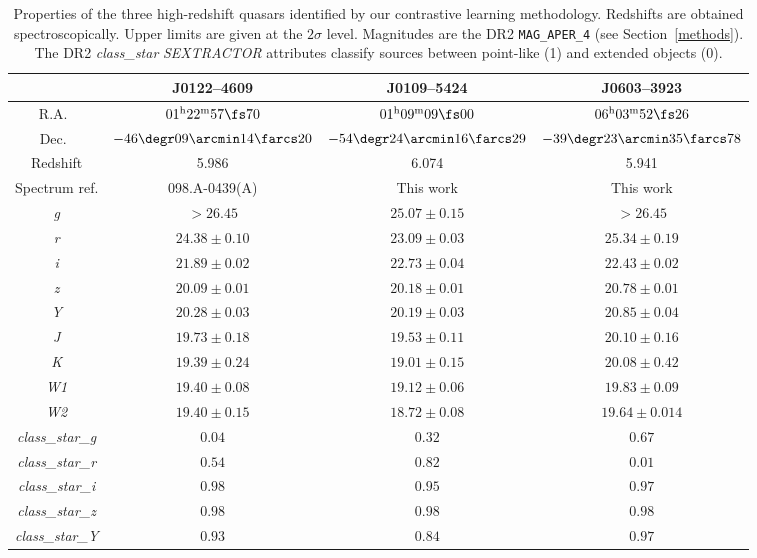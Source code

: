 \documentclass[fleqn,usenatbib]{mnras}
\begin{document}
\begin{table}
\centering
\caption{
Properties of the three high-redshift quasars identified by our contrastive learning methodology.
Redshifts are obtained spectroscopically.
Upper limits are given at the $2\sigma$ level.
Magnitudes are the DR2 \texttt{MAG\_APER\_4} (see Section~\ref{methods}). The DR2 \textit{class\_star} \textit{SEXTRACTOR} \citep{BertinArnouts96} attributes classify sources between point-like (1) and extended objects (0).
}
\label{tab:threequasars}
\begin{tabular}{cccc}
\hline
& J0122--4609 & J0109--5424 & J0603--3923\\
\hline
R.A.\
& $01^\text{h}22^\text{m}57\fs70$
& $01^\text{h}09^\text{m}09\fs00$
& $06^\text{h}03^\text{m}52\fs26$\\
Dec.\
& $-46\degr09\arcmin14\farcs20$
& $-54\degr24\arcmin16\farcs29$
& $-39\degr23\arcmin35\farcs78$\\
Redshift
& 5.986 & 6.074 & 5.941\\
Spectrum ref.
& 098.A-0439(A) & This work & This work \\
\textit{g}
&$>26.45$ & $25.07\pm0.15$ & $>26.45$ \\
\textit{r}
& $24.38\pm0.10$ & $23.09\pm0.03$ & $25.34\pm0.19$ \\
\textit{i}
& $21.89\pm0.02$ & $22.73\pm0.04$ & $22.43\pm0.02$ \\
\textit{z}
& $20.09\pm0.01$ & $20.18\pm0.01$ & $20.78\pm0.01$ \\
\textit{Y}
& $20.28\pm0.03$ & $20.19\pm0.03$ & $20.85\pm0.04$ \\
\textit{J}
& $19.73\pm0.18$ & $19.53\pm0.11$ & $20.10\pm0.16$ \\
\textit{K}
& $19.39\pm0.24$ & $19.01\pm0.15$ & $20.08\pm0.42$ \\
\textit{W1}
& $19.40\pm0.08$ & $19.12\pm0.06$ & $19.83\pm0.09$ \\
\textit{W2}
& $19.40\pm0.15$ & $18.72\pm0.08$ & $19.64\pm0.014$ \\
\textit{class\_star\_g} & $0.04$ & $0.32$ & $0.67$ \\
\textit{class\_star\_r} & $0.54$ & $0.82$ & $0.01$ \\
\textit{class\_star\_i} & $0.98$ & $0.95$ & $0.97$ \\
\textit{class\_star\_z} & $0.98$ & $0.98$ & $0.98$ \\
\textit{class\_star\_Y} & $0.93$ & $0.84$ & $0.97$ \\
\hline
\end{tabular}
\end{table}
\end{document}
